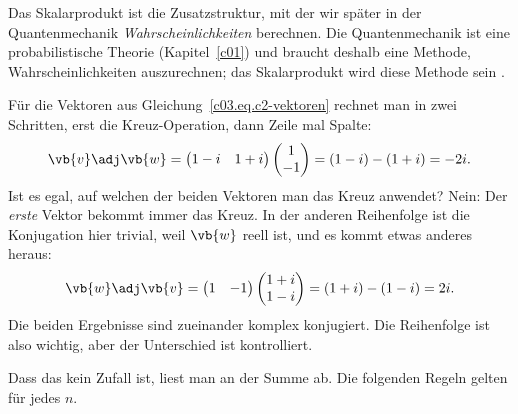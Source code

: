 Das Skalarprodukt ist die Zusatzstruktur, mit der wir später in der Quantenmechanik
\emph{Wahrscheinlichkeiten} berechnen. Die Quantenmechanik ist eine probabilistische Theorie
(Kapitel~\ref{c01}) und braucht deshalb eine Methode, Wahrscheinlichkeiten auszurechnen; das
Skalarprodukt wird diese Methode sein .

\begin{example}\label{c03.ex.skalarprodukt}
  Für die Vektoren aus Gleichung~\eqref{c03.eq.c2-vektoren} rechnet man in zwei Schritten,
  erst die Kreuz-Operation, dann Zeile mal Spalte:
  \begin{equation}\label{c03.eq.vw}
    \vb{v}\adj\vb{w}
    = \begin{pmatrix} 1-i & 1+i \end{pmatrix} \begin{pmatrix} 1 \\ -1 \end{pmatrix}
    = (1-i) - (1+i) = -2i .
  \end{equation}
  Ist es egal, auf welchen der beiden Vektoren man das Kreuz anwendet? Nein: Der
  \emph{erste} Vektor bekommt immer das Kreuz. In der anderen Reihenfolge ist die
  Konjugation hier trivial, weil $\vb{w}$ reell ist, und es kommt etwas anderes heraus:
  \begin{equation}\label{c03.eq.wv}
    \vb{w}\adj\vb{v}
    = \begin{pmatrix} 1 & -1 \end{pmatrix} \begin{pmatrix} 1+i \\ 1-i \end{pmatrix}
    = (1+i) - (1-i) = 2i .
  \end{equation}
  Die beiden Ergebnisse sind zueinander komplex konjugiert. Die Reihenfolge ist also wichtig,
  aber der Unterschied ist kontrolliert.
\end{example}

Dass das kein Zufall ist, liest man an der Summe ab. Die folgenden Regeln gelten für jedes
$n$.

